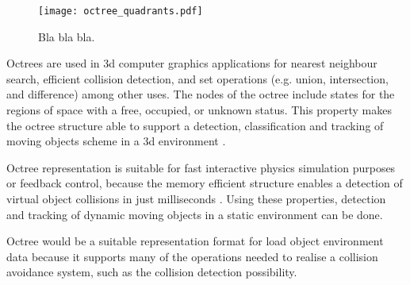 \documentclass[12pt,a4paper,oneside,pdftex]{report}
\begin{document}
\begin{figure}[ht]
  \begin{center}
    \texttt{[image: octree\_quadrants.pdf]}
    \caption{Bla bla bla.}
    \label{fig:octree_quadrants}
  \end{center}
\end{figure}

Octrees are used in 3d computer graphics applications for nearest neighbour search, efficient collision detection, and set operations (e.g. union, intersection, and difference) among other uses. The nodes of the octree include states for the regions of space with a free, occupied, or unknown status. This property makes the octree structure able to support a detection, classification and tracking of moving objects scheme in a 3d environment \citep{Azim12, Ouyang12}.

Octree representation is suitable for fast interactive physics simulation purposes or feedback control, because the memory efficient structure enables a detection of virtual object collisions in just milliseconds \citep{Noborio99}. Using these properties, detection and tracking of dynamic moving objects in a static environment can be done.

Octree would be a suitable representation format for load object environment data because it supports many of the operations needed to realise a collision avoidance system, such as the collision detection possibility.
\end{document}
